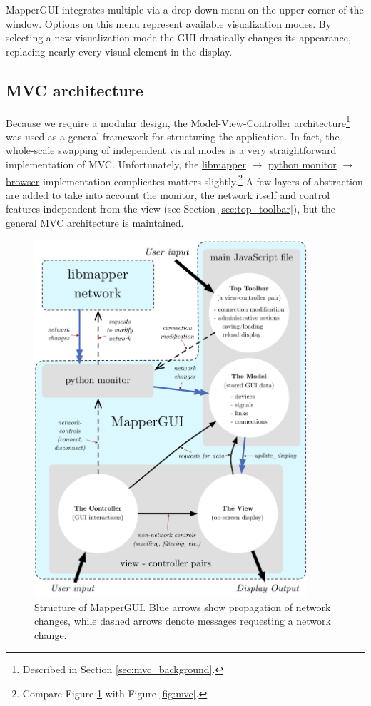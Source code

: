 MapperGUI integrates multiple via a drop-down menu on the upper corner of the window. Options on this menu represent available visualization modes. By selecting a new visualization mode the GUI drastically changes its appearance, replacing nearly every visual element in the display.

	\subsection{MVC architecture} %
	\label{sec:mvc_architecture}

Because we require a modular design, the Model-View-Controller architecture\footnote{Described in Section \ref{sec:mvc_background}.} was used as a general framework for structuring the application. In fact, the whole-scale swapping of independent visual modes is a very straightforward implementation of MVC. Unfortunately, the \url{libmapper} $\rightarrow$ \url{python monitor} $\rightarrow$ \url{browser} implementation complicates matters slightly.\footnote{Compare Figure \ref{fig:mapper_network} with Figure \ref{fig:mvc}.} A few layers of abstraction are added to take into account the monitor, the network itself and control features independent from the view (see Section \ref{sec:top_toolbar}), but the general MVC architecture is maintained.

\begin{figure}
\centering
	\includegraphics[width=0.9\textwidth]{figures/mapper_network}
\caption{Structure of MapperGUI. Blue arrows show propagation of network changes, while dashed arrows denote messages requesting a network change.}
\label{fig:mapper_network}
\end{figure}


